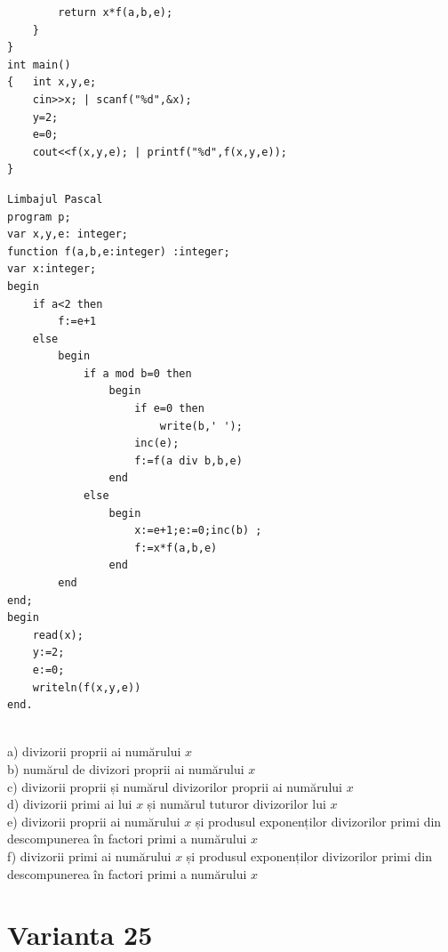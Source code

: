 {{\begin{verbatim}
        return x*f(a,b,e);
    }
}
int main()
{   int x,y,e;
    cin>>x; | scanf("%d",&x);
    y=2;
    e=0;
    cout<<f(x,y,e); | printf("%d",f(x,y,e));
}
\end{verbatim}
\begin{verbatim}
Limbajul Pascal
program p;
var x,y,e: integer;
function f(a,b,e:integer) :integer;
var x:integer;
begin
    if a<2 then
        f:=e+1
    else
        begin
            if a mod b=0 then
                begin
                    if e=0 then
                        write(b,' ');
                    inc(e);
                    f:=f(a div b,b,e)
                end
            else
                begin
                    x:=e+1;e:=0;inc(b) ;
                    f:=x*f(a,b,e)
                end
        end
end;
begin
    read(x);
    y:=2;
    e:=0;
    writeln(f(x,y,e))
end.
\end{verbatim}
\\
a) divizorii proprii ai numărului $x$
\\
b) numărul de divizori proprii ai numărului $x$
\\
c) divizorii proprii și numărul divizorilor proprii ai numărului $x$
\\
d) divizorii primi ai lui $x$ și numărul tuturor divizorilor lui $x$
\\
e) divizorii proprii ai numărului $x$ și produsul exponenților divizorilor primi din descompunerea în factori primi a numărului $x$
\\
f) divizorii primi ai numărului $x$ și produsul exponenților divizorilor primi din descompunerea în factori primi a numărului $x$
\\

\section*{Varianta 25}

}}
